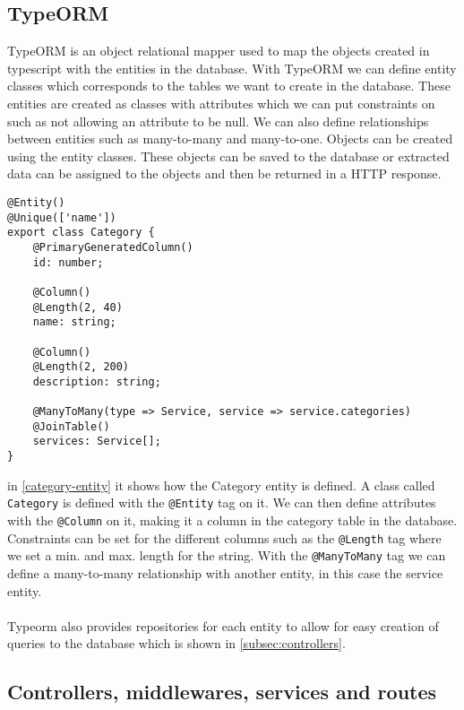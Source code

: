 \subsection{TypeORM}
TypeORM is an object relational mapper used to map the objects created in typescript with the entities in the database.
With TypeORM we can define entity classes which corresponds to the tables we want to create in the database.
These entities are created as classes with attributes which we can put constraints on such as not allowing an attribute to be null. 
We can also define relationships between entities such as many-to-many and many-to-one.
Objects can be created using the entity classes. 
These objects can be saved to the database or extracted data can be assigned to the objects and then be returned in a HTTP response. 

\begin{lstlisting}[caption={The category entity and its attributes}, captionpos=b, label={category-entity}]
@Entity()
@Unique(['name'])
export class Category {
	@PrimaryGeneratedColumn()
	id: number;

	@Column()
	@Length(2, 40)
	name: string;

	@Column()
	@Length(2, 200)
	description: string;

	@ManyToMany(type => Service, service => service.categories)
	@JoinTable()
	services: Service[];
}
\end{lstlisting}
in \autoref{category-entity} it shows how the Category entity is defined. A class called \texttt{Category} is defined with the \texttt{@Entity} tag on it. 
We can then define attributes with the \texttt{@Column} on it, making it a column in the category table in the database. 
Constraints can be set for the different columns such as the \texttt{@Length} tag where we set a min. and max. length for the string.
With the \texttt{@ManyToMany} tag we can define a many-to-many relationship with another entity, in this case the service entity. 
\\\\
Typeorm also provides repositories for each entity to allow for easy creation of queries to the database which is shown in \autoref{subsec:controllers}.

\subsection{Controllers, middlewares, services and routes}\label{subsec:controllers}

